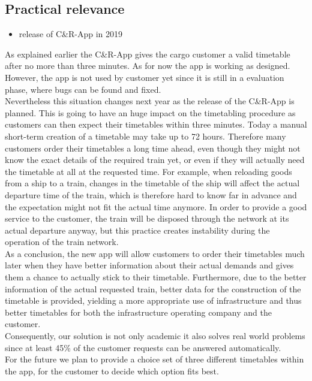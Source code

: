 \subsection{Practical relevance}
\begin{itemize}
  \item release of C\&R-App in 2019 \\
\end{itemize}
As explained earlier the C\&R-App gives the cargo customer a valid timetable after no more than three minutes. As for now the app is working as designed. However, the app is not used by customer yet since it is still in a evaluation phase, where bugs can be found and fixed. \\
Nevertheless this situation changes next year as the release of the C\&R-App is planned. This is going to have an huge impact on the timetabling procedure as customers can then expect their timetables within three minutes. Today a manual short-term creation of a timetable may take up to 72 hours. Therefore many customers order their timetables a long time ahead, even though they might not know the exact details of the required train yet, or even if they will actually need the timetable at all at the requested time.
For example, when reloading goods from a ship to a train, changes in the timetable of the ship will affect the actual departure time of the train, which is therefore hard to know far in advance and the expectation might not fit the actual time anymore. In order to provide a good service to the customer, the train will be disposed through the network at its actual departure anyway, but this practice creates instability during the operation of the train network.\\
As a conclusion, the new app will allow customers to order their timetables much later when they have better information about their actual demands and gives them a chance to actually stick to their timetable. Furthermore, due to the better information of the actual requested train, better data for the construction of the timetable is provided, yielding a more appropriate use of infrastructure and thus better timetables for both the infrastructure operating company and the customer. \\
Consequently, our solution is not only academic it also solves real world problems since at least 45\% of the customer requests can be answered automatically. \\
For the future we plan to provide a choice set of three different timetables within the app, for the customer to decide which option fits best. \\
